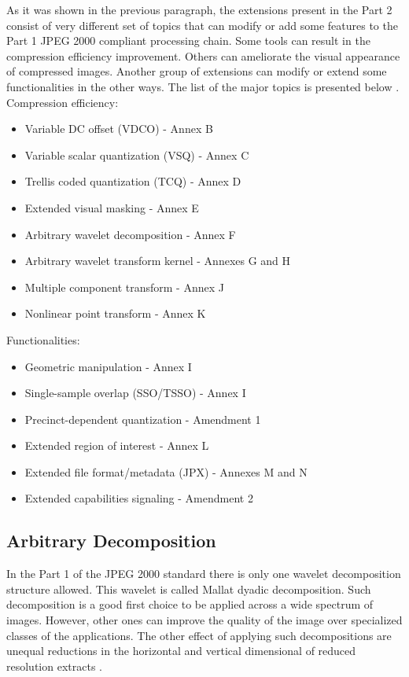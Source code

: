 As it was shown in the previous paragraph, the extensions present in the Part 2 consist of 
very different set of topics that can modify or add some features to the Part 1 JPEG 2000 compliant 
processing chain. Some tools can result in the compression efficiency improvement. Others can
ameliorate the visual appearance of compressed images. Another group of extensions can modify
or extend some functionalities in the other ways. The list of the major topics is presented below \cite{jpeg_suite}.
\newline \newline Compression efficiency:
\begin{itemize}
    \item Variable DC offset (VDCO) - Annex B
    \item Variable scalar quantization (VSQ) - Annex C
    \item Trellis coded quantization (TCQ) - Annex D
    \item Extended visual masking - Annex E
    \item Arbitrary wavelet decomposition - Annex F
    \item Arbitrary wavelet transform kernel - Annexes G and H
    \item Multiple component transform - Annex J
    \item Nonlinear point transform - Annex K \cite{jpeg_suite}
\end{itemize}
\hfill \break Functionalities:
\begin{itemize} 
    \item Geometric manipulation - Annex I
    \item Single-sample overlap (SSO/TSSO) - Annex I
    \item Precinct-dependent quantization - Amendment 1
    \item Extended region of interest - Annex L
    \item Extended file format/metadata (JPX) - Annexes M and N
    \item Extended capabilities signaling - Amendment 2 \cite{jpeg_suite}
\end{itemize}

\subsection{Arbitrary Decomposition}

In the Part 1 of the JPEG 2000 standard there is only one wavelet decomposition structure allowed.
This wavelet is called Mallat dyadic decomposition. Such decomposition is a good first choice
to be applied across a wide spectrum of images. However, other ones can improve the quality of the image
over specialized classes of the applications. The other effect of applying such decompositions are
unequal reductions in the horizontal and vertical dimensional of reduced resolution extracts \cite{jpeg_suite}.

